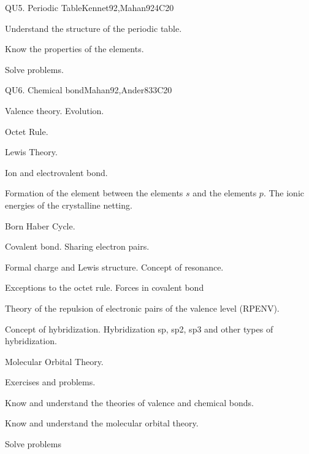 \begin{syllabus}
\begin{unit}{QU5. Periodic Table}{Kennet92,Mahan92}{}{4}{C20}
\begin{topics}
   \end{topics}

   \begin{learningoutcomes}
      \item Understand the structure of the periodic table.
      \item Know the properties of the elements.
      \item Solve problems.

   \end{learningoutcomes}
\end{unit}

\begin{unit}{QU6. Chemical bond}{}{Mahan92,Ander83}{3}{C20}
   \begin{topics}
        \item Valence theory. Evolution.
	\item Octet Rule.
	\item Lewis Theory.
	\item Ion and electrovalent bond.
	\item Formation of the element between the elements $ s $ and the elements $ p $. The ionic energies of the crystalline netting.
	\item Born Haber Cycle.
	\item Covalent bond. Sharing electron pairs.
	\item Formal charge and Lewis structure. Concept of resonance.
	\item Exceptions to the octet rule. Forces in covalent bond
	\item Theory of the repulsion of electronic pairs of the valence level (RPENV).
	\item Concept of hybridization. Hybridization sp, sp2, sp3 and other types of hybridization.
	\item Molecular Orbital Theory.
	\item Exercises and problems.
   \end{topics}

   \begin{learningoutcomes}

      \item Know and understand the theories of valence and chemical bonds.
      \item Know and understand the molecular orbital theory.
      \item Solve problems
   \end{learningoutcomes}
\end{unit}


\end{syllabus}
